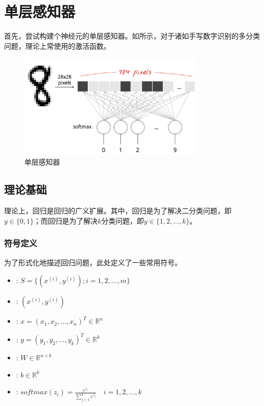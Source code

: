 \section{单层感知器}

\begin{content}

首先，尝试构建个神经元的单层感知器。如所示，对于诸如手写数字识别的多分类问题，理论上常使用的激活函数。

\begin{figure}[H]
\centering
\includegraphics[width=0.8\textwidth]{figures/mnist-slp.png}
\caption{单层感知器}
 \label{fig:mnist-slp}
\end{figure}

\subsection{理论基础}

理论上，回归是回归的广义扩展。其中，回归是为了解决二分类问题，即$y \in \{ 0,1\}$；而回归是为了解决$ k $分类问题，即$y \in \{ 1,2,...,k\}$。

\subsubsection{符号定义}

为了形式化地描述回归问题，此处定义了一些常用符号。

 \begin{itemize}
   \item {}: $ S = \{ ({x^{(i)}},{y^{(i)}});i = 1,2,...,m\} $
   \item {}: $ ({x^{(i)}},{y^{(i)}}) $
   \item {}: $ x = ({x_1},{x_2},...,{x_n})^{T}  \in {\mathbb{R}^n} $
   \item {}: $ y = ({y_1},{y_2},...,{y_k})^{T} \in {\mathbb{R}^k} $
   \item {}: $ W \in {\mathbb{R}^{n \times k}} $   
   \item {}: $ b \in {\mathbb{R}^k} $   
   \item {}: $ 
softmax {(z_i)} = \tfrac{{{e^{{z_i}}}}}{{\sum\limits_{j = 1}^k {{e^{{z_j}}}} }}  \quad i = 1,2,...,k
$
 \end{itemize}


\end{content}
